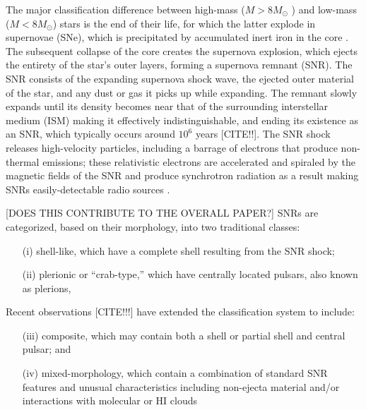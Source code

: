 \documentclass[12pt,preprint]{emulateapj}
\begin{document}
The major classification difference between high-mass ($M > 8M_{\odot}$ ) and low-mass ($M < 8 M_\odot$) stars is the end of their life, for which the latter explode in supernovae (SNe), which is precipitated by accumulated inert iron in the core \citep{Arnett.73}.  
The subsequent collapse of the core creates the supernova explosion, which ejects the entirety of the star’s outer layers, forming a supernova remnant (SNR).  The SNR consists of the expanding supernova shock wave, the ejected outer material of the star, and any dust or gas it picks up while expanding.  
The remnant slowly expands until its density becomes near that of the surrounding interstellar medium (ISM) making it effectively indistinguishable, and ending its existence as an SNR, which typically occurs around $10^6$ years [{\color{red}CITE!!}].  
The SNR shock releases high-velocity particles, including a barrage of electrons that produce non-thermal emissions; these relativistic electrons are accelerated and spiraled by the magnetic fields of the SNR and produce synchrotron radiation as a result making SNRs easily-detectable radio sources \citep[e.g.][]{Burbidge.56,stupar11}.

{\color{red}[DOES THIS CONTRIBUTE TO THE OVERALL PAPER?]}
SNRs are categorized, based on their morphology, into two traditional classes: 
\begin{itemize}
\item[(i)] shell-like, which have a complete shell resulting from the SNR shock;
\item[(ii)] plerionic or ``crab-type,'' which have centrally located pulsars, also known as plerions, \citep{weiler78}
\end{itemize} 
Recent observations {\color{red}[CITE!!!]} have extended the classification system to include: 
\begin{itemize}
\item[(iii)] composite, which may contain both a shell or partial shell and central pulsar; and
\item[(iv)] mixed-morphology, which contain a combination of standard SNR features and unusual characteristics including non-ejecta material and/or interactions with molecular or HI clouds \citep{rho98}
\end{itemize}
\end{document}
